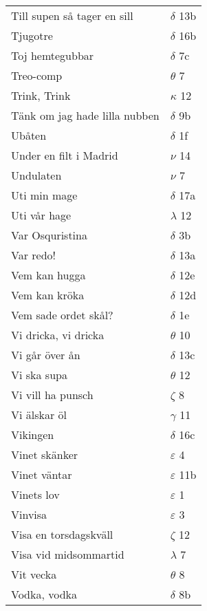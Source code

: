 \documentclass[a6paper,10pt]{article}
\begin{document}
\newpage
\setlength{\oddsidemargin}{-0.47in}
\begin{table}[!h]
\begin{tabular}{l l}
Till supen så tager en sill	&$\delta$ 13b\\
Tjugotre	&$\delta$ 16b\\
Toj hemtegubbar	&$\delta$ 7c\\
Treo-comp	&$\theta$ 7\\
Trink, Trink&	$\kappa$ 12\\
Tänk om jag hade lilla nubben&	$\delta$ 9b\\
Ubåten	&$\delta$ 1f\\
Under en filt i Madrid	&$\nu$ 14\\
Undulaten&	$\nu$ 7\\
Uti min mage	&$\delta$ 17a\\
Uti vår hage	&$\lambda$ 12\\
Var Osquristina	&$\delta$ 3b\\
Var redo!	&$\delta$ 13a\\
Vem kan hugga	&$\delta$ 12e\\
Vem kan kröka	&$\delta$ 12d\\
Vem sade ordet skål?	&$\delta$ 1e\\
Vi dricka, vi dricka&	$\theta$ 10\\
Vi går över ån	&$\delta$ 13c\\
Vi ska supa	&$\theta$ 12\\
Vi vill ha punsch	&$\zeta$ 8\\
Vi älskar öl	&$\gamma$ 11\\
Vikingen	&$\delta$ 16c\\
Vinet skänker	&$\varepsilon$ 4\\
Vinet väntar	&$\varepsilon$ 11b\\
Vinets lov	&$\varepsilon$ 1\\
Vinvisa	&$\varepsilon$ 3\\
Visa en torsdagskväll	&$\zeta$ 12\\
Visa vid midsommartid &$\lambda$ 7\\
Vit vecka	&$\theta$ 8\\
Vodka, vodka	&$\delta$ 8b\\
\end{tabular}
\end{table}
\newpage
\setlength{\oddsidemargin}{-0.37in}
\end{document}
